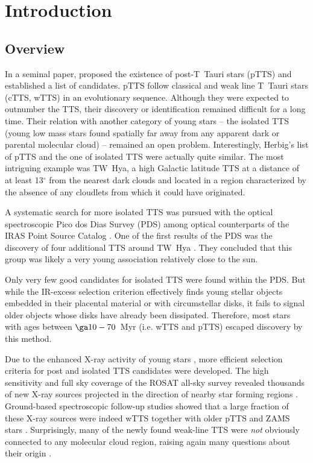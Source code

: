 \documentclass[11pt,twoside]{book}
\begin{document}
\section{Introduction}
\subsection{Overview}
In a seminal paper, \cite{Herbig1978} proposed the existence of post-T~Tauri stars (pTTS)
and established a list of candidates. pTTS follow classical and weak line
T~Tauri stars (cTTS, wTTS) in an evolutionary sequence.
Although they were expected to outnumber the TTS, their discovery or
identification remained difficult for a long time.
Their relation with another category of young stars -- the isolated TTS (young low mass stars
found spatially far away from any apparent dark or parental molecular cloud) --
remained an open problem.
Interestingly, Herbig's list of pTTS and the one of isolated TTS
\citep{Quast1987} were actually quite similar.
The most intriguing example was TW~Hya, a high Galactic latitude
TTS \citep{RucinskiKrautter1983} at a distance of at least 13$^\circ$ from the nearest  dark clouds
and located in a region characterized by the absence of any cloudlets from which it could have originated.

A systematic search for more isolated TTS was pursued with the  optical spectroscopic
Pico dos Dias Survey (PDS) among  optical counterparts of the  IRAS Point Source Catalog
\citep{gregorio92, Torres1995, Torres1999}.
One of the first results of the PDS was the discovery of four additional TTS
around TW~Hya  \citep{delareza89, gregorio92}.
They concluded that this group was likely a very young association relatively close to the sun.


Only very few good candidates for isolated TTS were found within the PDS.
But while the IR-excess selection criterion  effectively finds young stellar objects
embedded in their placental material or with circumstellar disks,
it fails to signal older objects whose disks have already been dissipated.
Therefore, most stars  with ages between $\ga10-70$~Myr (i.e. wTTS and pTTS)
escaped discovery by this method.

Due to the enhanced X-ray activity of young stars \citep{Walter86}, more efficient selection
criteria for post and isolated TTS candidates were developed.
The high sensitivity and full sky coverage of the ROSAT all-sky survey
\citep{truemper} revealed thousands of new X-ray sources projected in the
direction of nearby star forming regions \citep{Guillout98}.
Ground-based spectroscopic follow-up studies showed that a large fraction
of these X-ray sources were indeed wTTS  together with older pTTS and ZAMS
stars \citep[e.g.,][]{Alcala00}.
Surprisingly, many of the newly found weak-line TTS were {\it not} obviously
connected to any molecular cloud region,
raising again many questions about their origin \citep{Sterzik95}.
\end{document}
